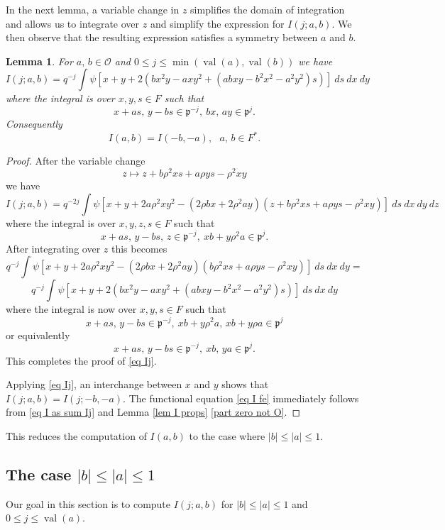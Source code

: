 \documentclass[12pt]{amsart}
\newcommand{\abs}[1]{\left|{#1}\right|}
\newcommand{\p}{\mathfrak{p}}
\renewcommand{\O}{\mathcal{O}}
\newcommand{\val}{{\operatorname{val}}}
\newtheorem{lemma}[theorem]{Lemma}
\theoremstyle{remark}
\begin{document}
\subsubsection{} 
In the next lemma, a variable change in $z$ simplifies the domain of integration and allows us to integrate over $z$ and simplify the expression for $I(j;a,b)$. We then observe that the resulting expression satisfies a symmetry between $a$ and $b$.   
\begin{lemma}
For $a,\,b\in\O$ and $0\le j\le \min(\val(a),\val(b))$ we have
\begin{equation}\label{eq Ij} 
I(j;a,b)=q^{-j} \int \psi[x+y+2\left(bx^2y-axy^2+(abxy-b^2x^2-a^2y^2)s\right)]  \ ds\ dx\ dy
\end{equation}
where the integral is over $x,y,s\in F$ such that
\[
x+as,\,y-bs\in \p^{-j},\ bx,\,ay \in \p^j.
\]
Consequently
\begin{equation}\label{eq I fe} 
I(a,b)=I(-b,-a), \ \ \ a,\, b\in F^*.
\end{equation}
\end{lemma}
\begin{proof}
After the variable change 
\[
z\mapsto z+b\rho^2 xs+a\rho ys-\rho^2xy
\]
we have
\[
I(j;a,b)=q^{-2j}\int \psi[x+y+2a\rho^2xy^2-(2\rho bx+2\rho^2ay)(z+b\rho^2 xs+a\rho ys-\rho^2xy)]  \ ds\ dx\ dy\ dz
\]
where the integral is over $x,y,z,s\in F$ such that
\[
x+as,\,y-bs,\,z\in \p^{-j},\ xb+y\rho^2a\in \p^j.
\]
After integrating over $z$ this becomes
\[
q^{-j} \int \psi[x+y+2a\rho^2xy^2-(2\rho bx+2\rho^2ay)(b\rho^2 xs+a\rho ys-\rho^2xy)]  \ ds\ dx\ dy=
\]
\[
q^{-j} \int \psi[x+y+2\left(bx^2y-axy^2+(abxy-b^2x^2-a^2y^2)s\right)]  \ ds\ dx\ dy
\]
where the integral is now over $x,y,s\in F$ such that
\[
x+as,\,y-bs\in \p^{-j},\ xb+y\rho^2a,\,xb+y\rho a \in \p^j
\]
or equivalently
\[
x+as,\,y-bs\in \p^{-j},\ xb,\,ya \in \p^j.
\]
This completes the proof of \eqref{eq Ij}. 

Applying \eqref{eq Ij}, an interchange between $x$ and $y$ shows that $I(j;a,b)=I(j;-b,-a)$.
The functional equation \eqref{eq I fe} immediately follows from \eqref{eq I as  sum Ij} and Lemma \ref{lem I props} \eqref{part zero not O}.
\end{proof}


This reduces the computation of $I(a,b)$ to the case where $\abs{b}\le \abs{a}\le 1$. 




\subsection{The case $\abs{b}\le \abs{a}\le 1$}
Our goal in this section is to compute $I(j;a,b)$ for $\abs{b}\le \abs{a}\le 1$ and $0\le j\le \val(a)$.
\end{document}
